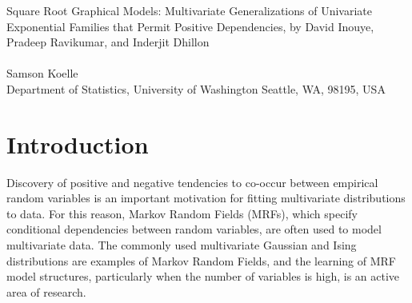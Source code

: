 \documentclass{samkoelleprelimworking}
\begin{document}
\begin{center}  
{\LARGE Square Root Graphical Models: Multivariate Generalizations of
Univariate Exponential Families that Permit Positive Dependencies, by David Inouye, Pradeep Ravikumar, and Inderjit Dhillon}\\\ \\   
 {Samson Koelle \\
    Department of Statistics, University of Washington Seattle, WA, 98195, USA  
     } 
  \end{center}
  
\begin{abstract} 
 

Understanding relationships between different categorical or quantitative random variables is a central problem in clustering, network reconstruction, and regression.  This paper proposes a multivariate distribution based on a Markov Random Field which encapsulates multivariate Gaussian and Ising graphical models.  The parameter space is expanded using a square root transformation of sufficient statistics to enable new multivariate dependencies.
\end{abstract}

\section{Introduction} 

Discovery of positive and negative tendencies to co-occur between empirical random variables is an important motivation for fitting multivariate distributions to data.  For this reason, Markov Random Fields (MRFs), which specify conditional dependencies between random variables, are often used to model multivariate data.  The commonly used multivariate Gaussian and Ising distributions are examples of Markov Random Fields, and the learning of MRF model structures, particularly when the number of variables is high, is an active area of research.
\end{document}

